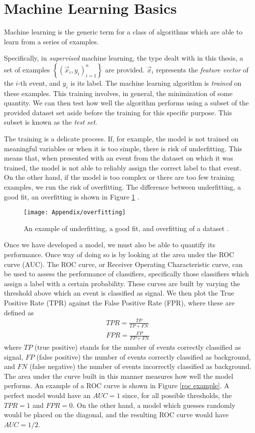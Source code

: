 \documentclass[10pt,a4paper]{book}
\begin{document}
\section{Machine Learning Basics}

Machine learning is the generic term for a class of algorithms which are able to learn from a series of examples. 

Specifically, in \emph{supervised} machine learning, the type dealt with in this thesis, a set of examples $\left\lbrace (\vec{x}_i, y_i)_{i = 1}^n \right\rbrace$ are provided. $\vec{x}_i$ represents the \emph{feature vector} of the $i$-th event, and $y_i$ is its label. The machine learning algorithm is \emph{trained} on these examples. This training involves, in general, the minimization of some quantity. We can then test how well the algorithm performs using a subset of the provided dataset set aside before the training for this specific purpose. This subset is known as the \emph{test set}.

The training is a delicate process. If, for example, the model is not trained on meaningful variables or when it is too simple, there is risk of underfitting. This means that, when presented with an event from the dataset on which it was trained, the model is not able to reliably assign the correct label to that event. On the other hand, if the model is too complex or there are too few training examples, we run the risk of overfitting. The difference between underfitting, a good fit, an overfitting is shown in Figure \ref{overfitting} . 

\begin{figure}
\centering
\texttt{[image: Appendix/overfitting]}
\caption{An example of underfitting, a good fit, and overfitting of a dataset \cite{burkov2019hundred}.}
\label{overfitting}
\end{figure}

Once we have developed a model, we must also be able to quantify its performance. Once way of doing so is by looking at the area under the ROC curve (AUC). The ROC curve, or Receiver Operating Characteristic curve, can be used to assess the performance of classifiers, specifically those classifiers which assign a label with a certain probability. These curves are built by varying the threshold above which an event is classified as signal. We then plot the True Positive Rate (TPR) against the False Positive Rate (FPR), where these are defined as
\begin{gather}
TPR = \frac{TP}{TP + FN} \\
FPR = \frac{FP}{FP + FN}
\end{gather}
where $TP$ (true positive) stands for the number of events correctly classified as signal, $FP$ (false positive) the number of events correctly classified as background, and $FN$ (false negative) the number of events incorrectly classified as background. The area under the curve built in this manner measures how well the model performs. An example of a ROC curve is shown in Figure \ref{roc example}. A perfect model would have an $AUC = 1$ since, for all possible thresholds, the $TPR = 1$ and $FPR = 0$. On the other hand, a model which guesses randomly would be placed on the diagonal, and the resulting ROC curve would have $AUC = 1/2$.
\end{document}
